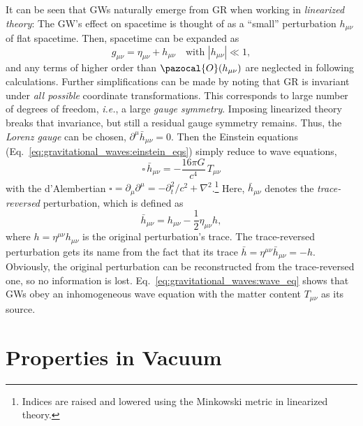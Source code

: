 It can be seen that GWs naturally emerge from GR when working in \emph{linearized theory}: The GW's effect on spacetime is thought of as a \enquote{small} perturbation $h_{\mu\nu}$ of flat spacetime. Then, spacetime can be expanded as
\begin{equation}
	\label{eq:gravitational_waves:linearized_theory}
	g_{\mu\nu} = \eta_{\mu\nu} + h_{\mu\nu} \quad\text{with $|h_{\mu\nu}|\ll1$},
\end{equation}
and any terms of higher order than $\pazocal{O}(h_{\mu\nu})$ are neglected in following calculations. Further simplifications can be made by noting that
GR is invariant under \emph{all possible} coordinate transformations. This corresponds to large number of degrees of freedom, \emph{i.e.}, a large \emph{gauge symmetry}. 
Imposing linearized theory breaks that invariance, but still a residual gauge symmetry remains. 
Thus, the \emph{Lorenz gauge} can be chosen, $\partial^\mu\bar{h}_{\mu\nu} = 0$. Then the Einstein equations (Eq.~\ref{eq:gravitational_waves:einstein_eqs}) simply reduce to wave equations,
\begin{equation}
	\label{eq:gravitational_waves:wave_eq}
	\square\,\bar{h}_{\mu\nu} = -\frac{16\pi G}{c^4}\,T_{\mu\nu}
\end{equation}
with the d'Alembertian $\square=\partial_\mu\partial^\mu=-\partial_t^2/c^2 + \nabla^2$.\footnote{Indices are raised and lowered using the Minkowski metric in linearized theory.}
Here, $\bar{h}_{\mu\nu}$ denotes the \emph{trace-reversed} perturbation, which is defined as
\begin{equation}
	\bar{h}_{\mu\nu} = h_{\mu\nu}-\frac{1}{2}\eta_{\mu\nu}h,
\end{equation}
where $h = \eta^{\mu\nu}h_{\mu\nu}$ is the original perturbation's trace. The trace-reversed perturbation gets its name from the fact that its trace $\bar{h} = \eta^{\mu\nu}\bar{h}_{\mu\nu} = -h$. Obviously, the original perturbation can be reconstructed from the trace-reversed one, so no information is lost. 
Eq.~\ref{eq:gravitational_waves:wave_eq} shows that GWs obey an inhomogeneous wave equation with the matter content $T_{\mu\nu}$ as its source. 

\section{Properties in Vacuum}

